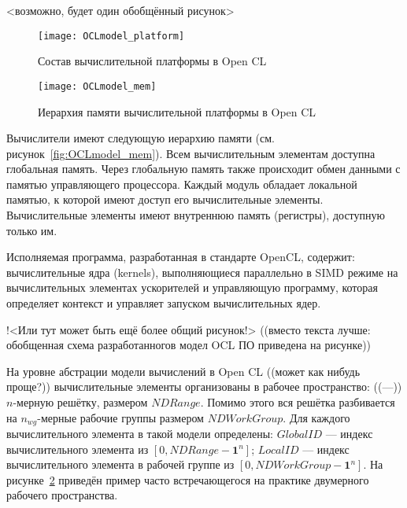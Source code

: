 <возможно, будет один обобщённый рисунок>
\begin{figure}[h!]
  \centering
  \texttt{[image: OCLmodel\_platform]} 
  \caption{Состав вычислительной платформы в Open CL}
  \label{fig:OCL_platform}
\end{figure}
\FloatBarrier

\begin{figure}[h!]
  \centering
  \texttt{[image: OCLmodel\_mem]} 
  \caption{Иерархия памяти вычислительной платформы в Open CL}
  \label{fig:OCL_wg}
\end{figure}
\FloatBarrier




Вычислители
имеют следующую иерархию памяти 
(см. рисунок~\ref{fig:OCLmodel_mem}).
Всем вычислительным элементам доступна глобальная память. 
Через глобальную память также происходит обмен данными с памятью управляющего процессора. 
Каждый модуль 
обладает локальной памятью, к которой имеют доступ
его вычислительные элементы.
Вычислительные элементы имеют внутреннюю  память (регистры), доступную только им.

Исполняемая программа, разработанная в стандарте OpenCL,
содержит:  
вычислительные ядра (kernels), выполняющиеся
параллельно 
в SIMD режиме 
на вычислительных элементах ускорителей
и управляющую программу, которая
определяет контекст и 
управляет запуском вычислительных ядер.

!<Или тут может быть ещё более общий рисунок!>
((вместо текста лучше: обобщенная схема разработанногов модел OCL ПО приведена на рисунке))



На уровне абстрации модели вычислений в Open CL ((может как нибудь проще?))
вычислительные элементы организованы в рабочее пространство: ((---))
$n$-мерную решётку,
размером $NDRange$.
Помимо этого вся решётка разбивается на $n_{wg}$-мерные рабочие группы
размером $NDWorkGroup$. 
Для каждого вычислительного элемента в такой модели определены:  
$GlobalID$ %
--- индекс вычислительного элемента из $[0, NDRange - \mathbf{1}^n]$;
$LocalID$ --- индекс вычислительного элемента в рабочей группе
из $[0, NDWorkGroup - \mathbf{1}^n]$. 
На рисунке~\ref{fig:OCL_wg} приведён пример
часто встречающегося на практике двумерного рабочего пространства.

